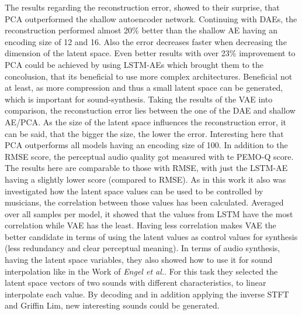 The results regarding the reconstruction error, showed to their surprise, that PCA outperformed the shallow autoencoder network. Continuing with DAEs, the reconstruction performed almost 20\% better than the shallow AE having an encoding size of 12 and 16. Also the error decreases faster when decreasing the dimension of the latent space. Even better results with over 23\% improvement to PCA could be achieved by using LSTM-AEs which brought them to the concolusion, that its beneficial to use more complex architectures. Beneficial not at least, as more compression and thus a small latent space can be generated, which is important for sound-synthesis. Taking the results of the VAE into comparison, the reconstuction error lies between the one of the DAE and shallow AE/PCA. As the size of the latent space influences the reconstruction error, it can be said, that the bigger the size, the lower the error. Interesting here that PCA outperforms all models having an encoding size of 100. In addition to the RMSE score, the perceptual audio quality got measured with te PEMO-Q score. The results here are comparable to those with RMSE, with just the LSTM-AE having a slightly lower score (compared to RMSE). As in this work it also was investigated how the latent space values can be used to be controlled by musicians, the correlation between those values has been calculated. Averaged over all samples per model, it showed that the values from LSTM have the most correlation while VAE has the least. Having less correlation makes VAE the better candidate in terms of using the latent values as control values for synthesis (less redundancy and clear perceptual meaning). In terms of audio synthesis, having the latent space variables, they also showed how to use it for sound interpolation like in the Work of \textit{Engel et al.}. For this task they selected the latent space vectors of two sounds with different characteristics, to linear interpolate each value. By decoding and in addition applying the inverse STFT and Griffin Lim, new interesting sounds could be generated. 

